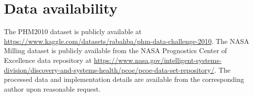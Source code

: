 \documentclass[a4paper,fleqn]{cas-sc}
\begin{document}
\section*{Data availability}
The PHM2010 dataset is publicly available at \href{https://www.kaggle.com/datasets/rabahba/phm-data-challenge-2010}{https://www.kaggle.com/datasets/rabahba/phm-data-challenge-2010}. The NASA Milling dataset is publicly available from the NASA Prognostics Center of Excellence data repository at \href{https://www.nasa.gov/intelligent-systems-division/discovery-and-systems-health/pcoe/pcoe-data-set-repository/}{https://www.nasa.gov/intelligent-systems-division/discovery-and-systems-health/pcoe/pcoe-data-set-repository/}. The processed data and implementation details are available from the corresponding author upon reasonable request.
\end{document}
